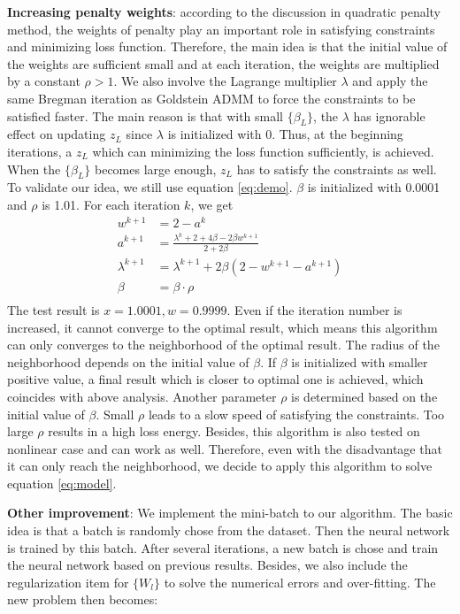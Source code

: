 \documentclass[letterpaper, 10 pt, conference]{ieeeconf}  %
\begin{document}
\textbf{Increasing penalty weights}: according to the discussion in quadratic penalty method, the weights of penalty play an important role in satisfying constraints and minimizing loss function. Therefore, the main idea is that the initial value of the weights are sufficient small and at each iteration, the weights are multiplied by a constant $\rho>1$. We also involve the Lagrange multiplier $\lambda$ and apply the same Bregman iteration as Goldstein ADMM to force the constraints to be satisfied faster. The main reason is that with small $\{\beta_L\}$, the $\lambda$ has ignorable effect on updating $z_L$ since $\lambda$ is initialized with 0. Thus, at the beginning iterations, a $z_L$ which can minimizing the loss function sufficiently, is achieved. When the $\{\beta_L\}$ becomes large enough, $z_L$ has to satisfy the constraints as well. To validate our idea, we still use equation \eqref{eq:demo}. $\beta$ is initialized with 0.0001 and $\rho$ is 1.01. For each iteration $k$, we get
\begin{equation}
\begin{aligned}
w^{k+1} &= 2-a^k \\
a^{k+1} &= \frac{\lambda^k+2+4\beta-2\beta w^{k+1}}{2+2\beta}\\
\lambda^{k+1} &= \lambda^{k+1} + 2\beta(2-w^{k+1}-a^{k+1})\\
\beta &= \beta \cdot \rho \\
\end{aligned}
\label{eq:demoupdate}
\end{equation}
The test result is $x=1.0001, w=0.9999$. Even if the iteration number is increased, it cannot converge to the optimal result, which means this algorithm can only converges to the neighborhood of the optimal result. The radius of the neighborhood depends on the initial value of $\beta$. If $\beta$ is initialized with smaller positive value, a final result which is closer to optimal one is achieved, which coincides with above analysis. Another parameter $\rho$ is determined based on the initial value of $\beta$. Small $\rho$ leads to a slow speed of satisfying the constraints. Too large $\rho$ results in a high loss energy. Besides, this algorithm is also tested on nonlinear case and can work as well. Therefore, even with the disadvantage that it can only reach the neighborhood, we decide to apply this algorithm to solve equation \eqref{eq:model}.



\textbf{Other improvement}: We implement the mini-batch to our algorithm. The basic idea is that a batch is randomly chose from the dataset. Then the neural network is trained by this batch. After several iterations, a new batch is chose and train the neural network based on previous results. Besides, we also include the regularization item for $\{W_l\}$ to solve the numerical errors and over-fitting. The new problem then becomes:
\end{document}

